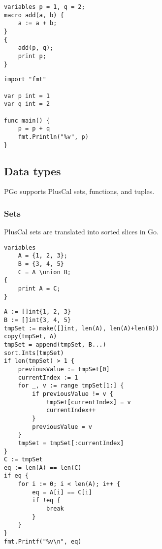 \noindent
\begin{minipage}[t]{0.45\textwidth}
\begin{lstlisting}[language=pcal]
variables p = 1, q = 2;
macro add(a, b) {
	a := a + b;
}
{
	add(p, q);
	print p;
}
\end{lstlisting}
\end{minipage}
\hfill
\begin{minipage}[t]{0.45\textwidth}
\begin{lstlisting}[language=golang]
import "fmt"

var p int = 1
var q int = 2

func main() {
	p = p + q
	fmt.Println("%v", p)
}
\end{lstlisting}
\end{minipage}

\subsection{Data types}
PGo supports PlusCal sets, functions, and tuples.
\subsubsection{Sets}
\label{sec:sets}
PlusCal sets are translated into sorted slices in Go.

\noindent
\begin{minipage}[t]{0.45\textwidth}
\begin{lstlisting}[language=pcal]
variables
	A = {1, 2, 3};
	B = {3, 4, 5}
	C = A \union B;
{
	print A = C;
}
\end{lstlisting}
\end{minipage}
\hfill
\begin{minipage}[t]{0.45\textwidth}
\begin{lstlisting}[language=golang]
A := []int{1, 2, 3}
B := []int{3, 4, 5}
tmpSet := make([]int, len(A), len(A)+len(B))
copy(tmpSet, A)
tmpSet = append(tmpSet, B...)
sort.Ints(tmpSet)
if len(tmpSet) > 1 {
	previousValue := tmpSet[0]
	currentIndex := 1
	for _, v := range tmpSet[1:] {
		if previousValue != v {
			tmpSet[currentIndex] = v
			currentIndex++
		}
		previousValue = v
	}
	tmpSet = tmpSet[:currentIndex]
}
C := tmpSet
eq := len(A) == len(C)
if eq {
	for i := 0; i < len(A); i++ {
		eq = A[i] == C[i]
		if !eq {
			break
		}
	}
}
fmt.Printf("%v\n", eq)
\end{lstlisting}
\end{minipage}

